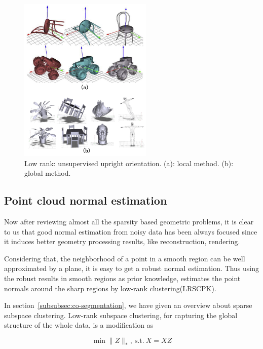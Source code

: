 \begin{figure}[ht]
  \centering
  \includegraphics[width=2.5in]{images/upright_lowrank}
  \caption{Low rank: unsupervised upright orientation. (a): local method\cite{jin2012unsupervised}. (b): global method\cite{wang2014upright}.}
  \label{fig:upright_lowrank}
\end{figure}




\subsection{Point cloud normal estimation}
\label{subsec:normal estimation}

Now after reviewing almost all the sparsity based geometric problems, it is clear to us that good normal estimation from noisy data has been always focused since it induces better geometry processing results, like reconstruction, rendering.

Considering that, the neighborhood of a point in a smooth region can be well approximated by a plane, it is easy to get a robust normal estimation.
Thus using the robust results in smooth regions as prior knowledge, \cite{zhang2013point} estimates the point normals around the sharp regions by low-rank clustering(LRSCPK).

In section~\ref{subsubsec:co-segmentation}, we have given an overview about sparse subspace clustering. Low-rank subspace clustering, for capturing the global structure of the whole data, is a modification as

\small{
\begin{equation}
 \label{eq:LSC}
 \min \|Z\|_{*},~\textrm{s.t.}~X=XZ
\end{equation}
}

